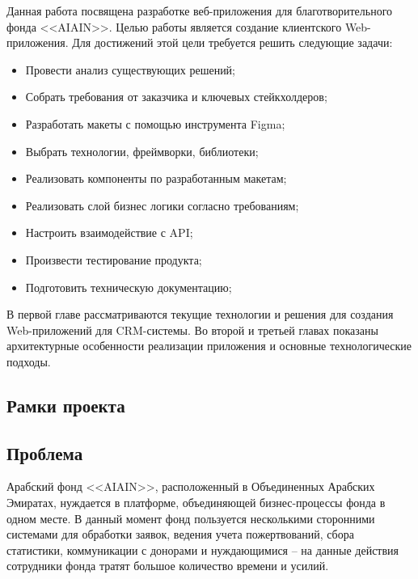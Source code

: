 \documentclass[a4paper,12pt,reqno]{article}
\begin{document}
Данная работа посвящена разработке веб-приложения для благотворительного фонда <<AIAIN>>. Целью работы является создание клиентского Web-приложения. Для достижений этой цели требуется решить следующие задачи:

\begin{itemize}
    \item Провести анализ существующих решений;
    \item Собрать требования от заказчика и ключевых стейкхолдеров;
    \item Разработать макеты с помощью инструмента Figma;
    \item Выбрать технологии, фреймворки, библиотеки;
    \item Реализовать компоненты по разработанным макетам;
    \item Реализовать слой бизнес логики согласно требованиям;
    \item Настроить взаимодействие с API;
    \item Произвести тестирование продукта;
    \item Подготовить техническую документацию;
\end{itemize}

В первой главе рассматриваются текущие технологии и решения для создания Web-приложений для CRM-системы.
Во второй и третьей главах показаны архитектурные особенности реализации приложения и основные технологические подходы.

\setcounter{section}{1}


\subsection{Рамки проекта}



\subsection{Проблема}

Арабский фонд <<AIAIN>>, расположенный в Объединенных Арабских Эмиратах, нуждается в платформе, объединяющей бизнес-процессы фонда в одном месте. В данный момент фонд пользуется несколькими сторонними системами для обработки заявок, ведения учета пожертвований, сбора статистики, коммуникации с донорами и нуждающимися -- на данные действия сотрудники фонда тратят большое количество времени и усилий. 
\end{document}
